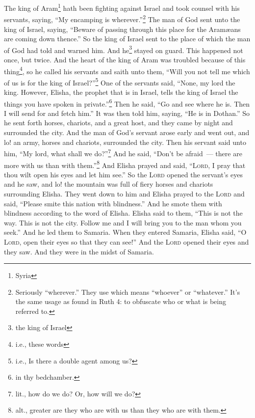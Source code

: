 \begin{inparaenum}
     The king of Aram\footnote{Syria} hath been fighting against Israel and took counsel with his servants, saying, ``My encamping is wherever.''\footnote{Seriously ``wherever.'' They use  which means ``whoever'' or ``whatever.'' It's the same usage as found in Ruth 4\thinspace: to obfuscate who or what is being referred to.}%
     The man of God sent unto the king of Israel, saying, ``Beware of passing through this place for the Aram\ae{}ans are coming down thence.''%
     So the king of Israel sent to the place of which the man of God had told and warned him. And he\footnote{the king of Israel} stayed on guard. This happened not once, but twice.%
     And the heart of the king of Aram was troubled because of this thing\footnote{i.e., these words}, so he called his servants and saith unto them, ``Will you not tell me which of us is for the king of Israel?''\footnote{i.e., Is there a double agent among us?}%
     One of the servants said, ``None, my lord the king. However, Elisha, the prophet that is in Israel, tells the king of Israel the things you have spoken in private.''\footnote{in thy bedchamber.}%
     Then he said, ``Go and see where he is. Then I will send for and fetch him.'' It was then told him, saying, ``He is in Dothan.''%
     So he sent forth horses, chariots, and a great host, and they came by night and surrounded the city.%
     And the man of God's servant arose early and went out, and lo! an army, horses and chariots, surrounded the city. Then his servant said unto him, ``My lord, what shall we do?''\footnote{lit., how do we do? Or, how will we do?}%
     And he said, ``Don't be afraid~--- there are more with us than with them.''\footnote{alt., greater are they who are with us than they who are with them.}%
     And Elisha prayed and said, ``\textsc{Lord}, I pray that thou wilt open his eyes and let him see.'' So the \textsc{Lord} opened the servant's eyes and he saw, and lo! the mountain was full of fiery horses and chariots surrounding Elisha.%
     They went down to him and Elisha prayed to the \textsc{Lord} and said, ``Please smite this nation with blindness.'' And he smote them with blindness according to the word of Elisha.%
     Elisha said to them, ``This is not the way. This is not the city. Follow me and I will bring you to the man whom you seek.'' And he led them to Samaria.%
     When they entered Samaria, Elisha said, ``O \textsc{Lord}, open their eyes so that they can see!'' And the \textsc{Lord} opened their eyes and they saw. And they were in the midst of Samaria.%

\end{inparaenum}
